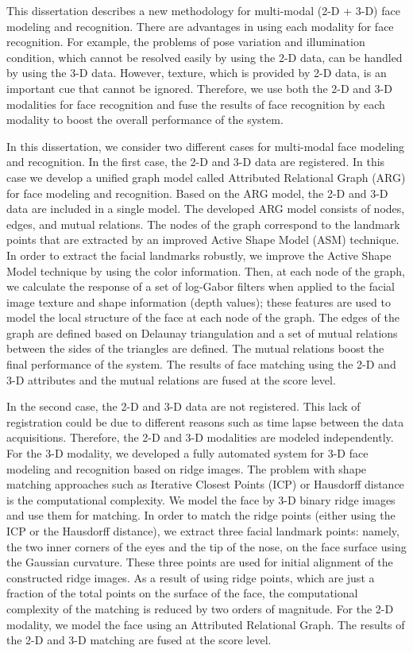 \normalsize{This dissertation describes a new methodology for
multi-modal (2-D + 3-D) face modeling and recognition. There are
advantages in using each modality for face recognition. For example,
the problems of pose variation and illumination condition, which
cannot be resolved easily by using the 2-D data, can be handled by
using the 3-D data. However, texture, which is provided by 2-D data,
is an important cue that cannot be ignored. Therefore, we use both
the 2-D and 3-D modalities for face recognition and fuse the results
of face recognition by each modality to boost the overall
performance of the system.

In this dissertation, we consider two different cases for
multi-modal face modeling and recognition. In the first case, the
2-D and 3-D data are registered. In this case we develop a unified
graph model called Attributed Relational Graph (ARG) for face
modeling and recognition. Based on the ARG model, the 2-D and 3-D
data are included in a single model. The developed ARG model
consists of nodes, edges, and mutual relations. The nodes of the
graph correspond to the landmark points that are extracted by an
improved Active Shape Model (ASM) technique. In order to extract the
facial landmarks robustly, we improve the Active Shape Model
technique by using the color information. Then, at each node of the
graph, we calculate the response of a set of log-Gabor filters when
applied to the facial image texture and shape information (depth
values); these features are used to model the local structure of the
face at each node of the graph. The edges of the graph are defined
based on Delaunay triangulation and a set of mutual relations
between the sides of the triangles are defined. The mutual relations
boost the final performance of the system. The results of face
matching using the 2-D and 3-D attributes and the mutual relations
are fused at the score level.

In the second case, the 2-D and 3-D data are not registered. This
lack of registration could be due to different reasons such as time
lapse between the data acquisitions. Therefore, the 2-D and 3-D
modalities are modeled independently. For the 3-D modality, we
developed a fully automated system for 3-D face modeling and
recognition based on ridge images. The problem with shape matching
approaches such as Iterative Closest Points (ICP) or Hausdorff
distance is the computational complexity. We model the face by 3-D
binary ridge images and use them for matching. In order to match the
ridge points (either using the ICP or the Hausdorff distance), we
extract three facial landmark points: namely, the two inner corners
of the eyes and the tip of the nose, on the face surface using the
Gaussian curvature. These three points are used for initial
alignment of the constructed ridge images. As a result of using
ridge points, which are just a fraction of the total points on the
surface of the face, the computational complexity of the matching is
reduced by two orders of magnitude. For the 2-D modality, we model
the face using an Attributed Relational Graph. The results of the
2-D and 3-D matching are fused at the score level.

}

